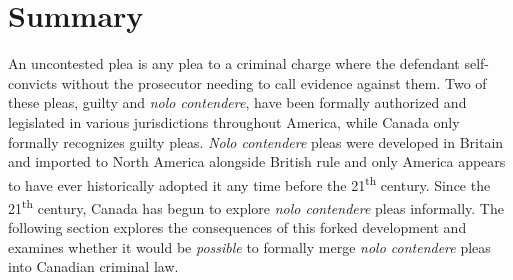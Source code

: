 \section{Summary}

An uncontested plea is any plea to a criminal charge where the defendant self-convicts without the prosecutor needing to call evidence against them. Two of these pleas, guilty and \textit{nolo contendere}, have been formally authorized and legislated in various jurisdictions throughout America, while Canada only formally recognizes guilty pleas. \textit{Nolo contendere} pleas were developed in Britain and imported to North America alongside British rule and only America appears to have ever historically adopted it any time before the 21\textsuperscript{th} century. Since the 21\textsuperscript{th} century, Canada has begun to explore \textit{nolo contendere} pleas informally. The following section explores the consequences of this forked development and examines whether it would be \textit{possible} to formally merge \textit{nolo contendere} pleas into Canadian criminal law. 